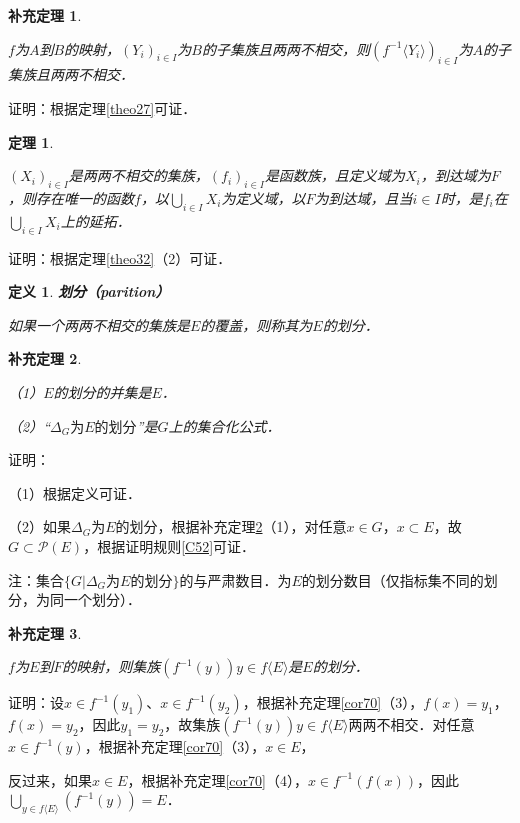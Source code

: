\documentclass[12pt, a4paper, oneside]{book}
\newtheorem{theo}{定理}
\newtheorem{cor}{补充定理}
\newtheorem{de}{定义}
\begin{document}
			\begin{cor}\label{cor113}
				\hfill\par
				$f$为$A$到$B$的映射，$(Y_i)_{i\in I}$为$B$的子集族且两两不相交，则$(f^{-1}\langle Y_i\rangle)_{i\in I}$为$A$的子集族且两两不相交．
			\end{cor}
			证明：根据定理\ref{theo27}可证．		
			
			\begin{theo}\label{theo33}
				\hfill\par
				$(X_i)_{i\in I}$是两两不相交的集族，$(f_i)_{i\in I}$是函数族，且定义域为$X_i$，到达域为$F$，则存在唯一的函数$f$，以$\bigcup\limits_{i\in I}X_i$为定义域，以$F$为到达域，且当$i\in I$时，是$f_i$在$\bigcup\limits_{i\in I}X_i$上的延拓．
			\end{theo}
			证明：根据定理\ref{theo32}（2）可证．

			\begin{de}
				\textbf{划分（parition）}
				\par
				如果一个两两不相交的集族是$E$的覆盖，则称其为$E$的划分．
			\end{de}
						
			\begin{cor}\label{cor114}
				\hfill\par
				（1）$E$的划分的并集是$E$．
				\par
				（2）“$\Delta_G\text{为}E\text{的划分}$”是$G$上的集合化公式．
			\end{cor}
			证明：
			\par
			（1）根据定义可证．
			\par
			（2）如果$\Delta_G$为$E$的划分，根据补充定理\ref{cor114}（1），对任意$x\in G$，$x\subset E$，故$G\subset \mathcal{P}(E)$，根据证明规则\ref{C52}可证．
			\par
			注：集合$\{G|\Delta_G\text{为}E\text{的划分}\}$的与严肃数目．为$E$的划分数目（仅指标集不同的划分，为同一个划分）．
			\par
			
			\begin{cor}\label{cor115}
				\hfill\par
				$f$为$E$到$F$的映射，则集族$(f^{-1}(y)){y\in f\langle E \rangle }$是$E$的划分．
			\end{cor}
			证明：设$x\in f^{-1}(y_1)$、$x\in f^{-1}(y_2)$，根据补充定理\ref{cor70}（3），$f(x)=y_1$，$f(x)=y_2$，因此$y_1=y_2$，故集族$(f^{-1}(y))y\in f\langle E \rangle $两两不相交．对任意$x\in f^{-1}(y)$，根据补充定理\ref{cor70}（3），$x\in E$，
			\par
			反过来，如果$x\in E$，根据补充定理\ref{cor70}（4），$x\in f^{-1}(f(x))$，因此$\bigcup\limits_{y\in f\langle E \rangle }(f^{-1}(y))=E$．				
						
\end{document}
